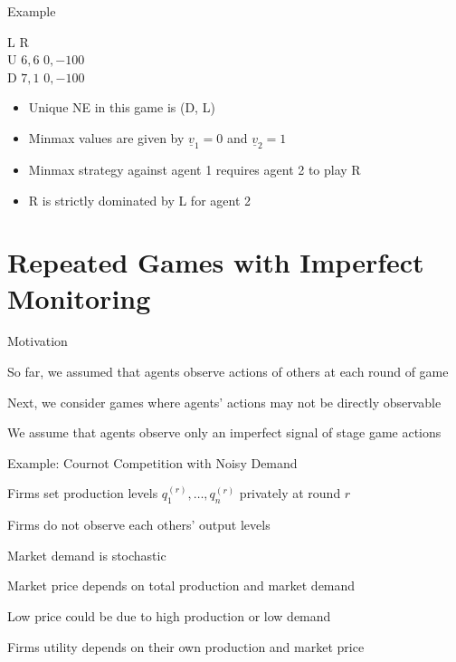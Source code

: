 \documentclass[11pt,aspectratio=169]{beamer}
\begin{document}
  
  \begin{frame}{Example}
   \begin{center}
    \hspace{-0.2em}
    \begin{game}{2}{2}
     	\> L			\> R				\\
     U	\> $6, 6$	\> $ 0, -100$	\\
     D	\> $7, 1$	\> $ 0, -100$
    \end{game}
   \end{center}
   \vspace{1em}
   \begin{itemize}
    \item Unique NE in this game is (D, L)
    \item Minmax values are given by $\underline{v}_{1} = 0 $ and $\underline{v}_{2} = 1 $ 
    \item Minmax strategy against agent 1 requires agent 2 to play R
    \item R is strictly dominated by L for agent 2
   \end{itemize}
  \end{frame}
  
 \section{Repeated Games with Imperfect Monitoring}
 
  \begin{frame}{Motivation}
   \begin{itemizes}[1.5em]
    \item So far, we assumed that agents observe actions of others at each round of game
    \item Next, we consider games where agents' actions may not be directly observable
    \item We assume that agents observe only an \alert{imperfect signal} of stage game actions
   \end{itemizes}
  \end{frame}   
 
  
  \begin{frame}{Example: Cournot Competition with Noisy Demand\\
  \vspace{-0.2cm}{\scriptsize [Green and Porter, Non-cooperative Collusion under Imperfect Price Information, 1984]}}
   \begin{itemizes}
    \item Firms set production levels $q_1^{(r)}, \dots, q_n^{(r)}$ \alert{privately} at round $r$
    \item Firms do not observe each others' output levels
    \item Market demand is \alert{stochastic}
    \item Market price depends on total production and market demand
    \item Low price could be due to high production or low demand
    \item Firms utility depends on their own production and market price
   \end{itemizes}
  \end{frame}
\end{document}
